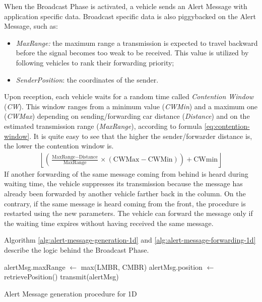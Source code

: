 		
		When the Broadcast Phase is activated, a vehicle sends an Alert Message with application specific data. Broadcast specific data is also piggybacked on the Alert Message, such as:
		\begin{itemize}
			\item \textit{MaxRange:} the maximum range a transmission is expected to travel backward before the signal becomes too weak to be received. This value is utilized by following vehicles to rank their forwarding priority;
			\item \textit{SenderPosition}: the coordinates of the sender.
		\end{itemize}
		Upon reception, each vehicle waits for a random time called \textit{Contention Window} (\textit{CW}). This window ranges from a minimum value (\textit{CWMin}) and a maximum one (\textit{CWMax}) depending on sending/forwarding car distance (\textit{Distance}) and on the estimated transmission range (\textit{MaxRange}), according to formula \ref{eq:contention-window}. It is quite easy to see that the higher the sender/forwarder distance is, the lower the contention window is.
		\begin{gather}
			\left\lfloor \left( \frac{\text{MaxRange} - \text{Distance}}{\text{MaxRange}} \times (\text{CWMax} - \text{CWMin}) \right) + \text{CWmin}  \right\rfloor
			\label{eq:contention-window}
		\end{gather}
		If another forwarding of the same message coming from behind is heard during waiting time, the vehicle suppresses its transmission because the message has already been forwarded by another vehicle farther back in the column. On the contrary, if the same message is heard coming from the front, the procedure is restarted using the new parameters. The vehicle can forward the message only if the waiting time expires without having received the same message.
		
		Algorithm \ref{alg:alert-message-generation-1d} and \ref{alg:alert-message-forwarding-1d} describe the logic behind the Broadcast Phase.
		
		\begin{algorithm}[H]
			\begin{algorithmic}[1]
				\State alertMsg.maxRange $\gets$ max(LMBR, CMBR)
				\State alertMsg.position $\gets$ retrievePosition()
				\State transmit(alertMsg)
			\end{algorithmic}
			\caption{Alert Message generation procedure for 1D}
			\label{alg:alert-message-generation-1d}
		\end{algorithm}
	
